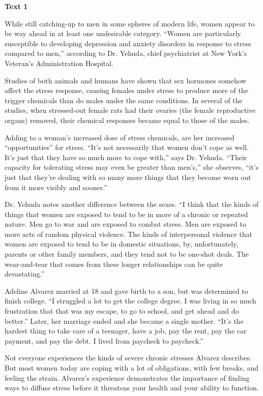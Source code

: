 \begin{center}\textbf{Text 1}\end{center}

\qquad While still catching-up to men in some spheres of modern life, women appear to be way ahead in at least one undesirable category. “Women are particularly susceptible to developing depression and anxiety disorders in response to stress compared to men,” according to Dr. Yehuda, chief psychiatrist at New York’s Veteran’s Administration Hospital.

\qquad Studies of both animals and humans have shown that sex hormones somehow affect the stress response, causing females under stress to produce more of the trigger chemicals than do males under the same conditions. In several of the studies, when stressed-out female rats had their ovaries (the female reproductive organs) removed, their chemical responses became equal to those of the males.

\qquad Adding to a woman’s increased dose of stress chemicals, are her increased “opportunities” for stress. “It’s not necessarily that women don’t cope as well. It’s just that they have so much more to cope with,” says Dr. Yehuda. “Their capacity for tolerating stress may even be greater than men’s,” she observes, “it’s just that they’re dealing with so many more things that they become worn out from it more visibly and sooner.”

\qquad Dr. Yehuda notes another difference between the sexes. “I think that the kinds of things that women are exposed to tend to be in more of a chronic or repeated nature. Men go to war and are exposed to combat stress. Men are exposed to more acts of random physical violence. The kinds of interpersonal violence that women are exposed to tend to be in domestic situations, by, unfortunately, parents or other family members, and they tend not to be one-shot deals. The wear-and-tear that comes from these longer relationships can be quite devastating.”

\qquad Adeline Alvarez married at 18 and gave birth to a son, but was determined to finish college. “I struggled a lot to get the college degree. I was living in so much frustration that that was my escape, to go to school, and get ahead and do better.” Later, her marriage ended and she became a single mother. “It’s the hardest thing to take care of a teenager, have a job, pay the rent, pay the car payment, and pay the debt. I lived from paycheck to paycheck.”

\qquad Not everyone experiences the kinds of severe chronic stresses Alvarez describes. But most women today are coping with a lot of obligations, with few breaks, and feeling the strain. Alvarez’s experience demonstrates the importance of finding ways to diffuse stress before it threatens your health and your ability to function.

